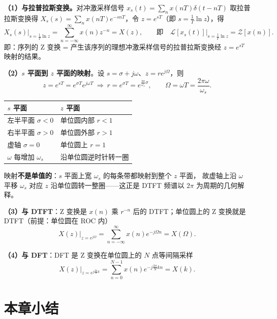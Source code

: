 \textbf{（1）与拉普拉斯变换。}对冲激采样信号 $x_s(t)=\sum_n x(nT)\delta(t-nT)$ 取拉普拉斯变换得
$X_s(s)=\sum_n x(nT)e^{-snT}$，令 $z=e^{sT}$（即 $s=\frac{1}{T}\ln z$），得
\begin{equation}
X_s(s)\Big|_{s=\frac{1}{T}\ln z}=\sum_{n=-\infty}^{\infty}x(n)z^{-n}=X(z),
\qquad\text{即}\quad
\mathcal{L}[x_s(t)]\Big|_{s=\frac{1}{T}\ln z}=\mathcal{Z}[x(n)].
\end{equation}
即：序列的 Z 变换 = 产生该序列的理想冲激采样信号的拉普拉斯变换经 $z=e^{sT}$ 映射的结果。

\textbf{（2）$s$ 平面到 $z$ 平面的映射}。设 $s=\sigma+j\omega$、$z=re^{j\Omega}$，则
\begin{equation}
z=e^{sT}=e^{\sigma T}e^{j\omega T}
\ \Longrightarrow\
r=e^{\sigma T}=e^{\frac{2\pi}{\omega_s}\sigma},\qquad
\Omega=\omega T=\frac{2\pi\omega}{\omega_s}.
\end{equation}

\begin{center}
\begin{tabular}{ll}
\toprule
$s$ 平面 & $z$ 平面 \\
\midrule
左半平面 $\sigma<0$ & 单位圆内部 $r<1$ \\
右半平面 $\sigma>0$ & 单位圆外部 $r>1$ \\
虚轴 $\sigma=0$ & 单位圆上 $r=1$ \\
$\omega$ 每增加 $\omega_s$ & 沿单位圆逆时针转一圈 \\
\bottomrule
\end{tabular}
\end{center}
映射\textbf{不是单值的}：$s$ 平面上宽 $\omega_s$ 的每条带都映射到整个 $z$ 平面，
故虚轴上沿 $\omega$ 平移 $\omega_s$ 对应 $z$ 沿单位圆转一整圈——这正是 DTFT 频谱以 $2\pi$ 为周期的几何解释。

\textbf{（3）与 DTFT}：Z 变换是 $x(n)$ 乘 $r^{-n}$ 后的 DTFT；单位圆上的 Z 变换就是 DTFT（前提：单位圆在 ROC 内）
\begin{equation}
X(z)\Big|_{z=e^{j\Omega}}=\sum_{n=-\infty}^{\infty}x(n)e^{-j\Omega n}=X(\Omega).
\end{equation}

\textbf{（4）与 DFT}：DFT 是 Z 变换在单位圆上的 $N$ 点等间隔采样
\begin{equation}
X(z)\Big|_{z=e^{j\frac{2\pi}{N}k}}
=\sum_{n=0}^{N-1}x(n)e^{-j\frac{2\pi}{N}kn}=X(k).
\end{equation}

\section{本章小结}

